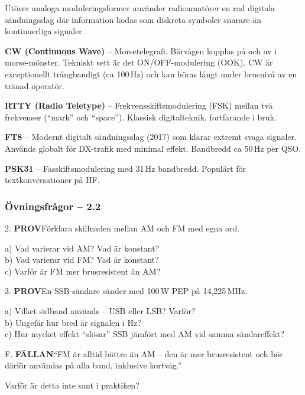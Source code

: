 \documentclass[a4paper,11pt,twoside]{book}
\newcommand{\emoji}[1]{{\emojifont #1}}
\newcommand{\qprov}{\colorbox{redpale}{\textcolor{reddark}{\headingfont\bfseries\tiny PROV}}}
\newcommand{\qfallan}{\colorbox{ljusbrun}{\textcolor{kakao}{\headingfont\bfseries\tiny FÄLLAN}}}
\begin{document}
Utöver analoga moduleringsformer använder radioamatörer en rad
digitala sändningsslag där information kodas som diskreta symboler
snarare än kontinuerliga signaler.

\begin{bluebox}[title={\emoji{🔑} Digitala sändningsslag}]
\textbf{CW (Continuous Wave)} -- Morsetelegrafi.
Bärvågen kopplas på och av i morse-mönster. Tekniskt sett
är det ON/OFF-modulering (OOK). CW är exceptionellt
trångbandigt (ca 100\,Hz) och kan höras långt under brusnivå
av en tränad operatör.

\medskip
\textbf{RTTY (Radio Teletype)} -- Frekvensskiftsmodulering (FSK)
mellan två frekvenser (``mark'' och ``space''). Klassisk
digitalteknik, fortfarande i bruk.

\medskip
\textbf{FT8} -- Modernt digitalt sändningsslag (2017) som
klarar extremt svaga signaler. Används globalt för DX-trafik
med minimal effekt. Bandbredd ca 50\,Hz per QSO.

\medskip
\textbf{PSK31} -- Fasskiftsmodulering med 31\,Hz bandbredd.
Populärt för textkonversationer på HF.
\end{bluebox}

\subsubsection*{Övningsfrågor -- 2.2}

\begin{qblock}{2.}
\qprov\quad Förklara skillnaden mellan AM och FM med egna ord.

a) Vad varierar vid AM? Vad är konstant?\\
b) Vad varierar vid FM? Vad är konstant?\\
c) Varför är FM mer brusresistent än AM?
\end{qblock}

\begin{qblock}{3.}
\qprov\quad En SSB-sändare sänder med 100\,W PEP på 14,225\,MHz.

a) Vilket sidband används -- USB eller LSB? Varför?\\
b) Ungefär hur bred är signalen i Hz?\\
c) Hur mycket effekt ``slösar'' SSB jämfört med AM vid samma
   sändareffekt?
\end{qblock}

\begin{qblock}{F.}
\qfallan\quad ``FM är alltid bättre än AM -- den är mer brusresistent
och bör därför användas på alla band, inklusive kortvåg.''

Varför är detta inte sant i praktiken?
\end{qblock}
\end{document}
